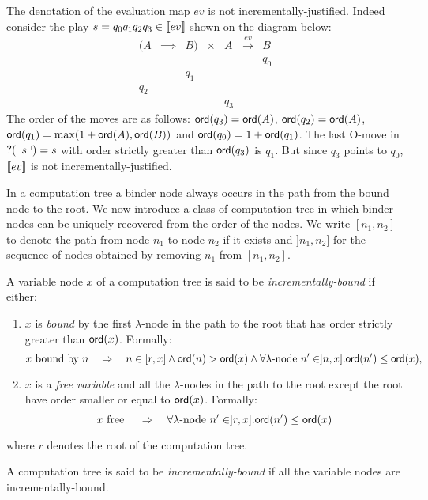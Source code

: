 \begin{exmp}
\label{examp:evnotincrjust}
The denotation of the evaluation map $ev$ is not
incrementally-justified. Indeed consider the play $s = q_0 q_1 q_2
q_3 \in {[\![ev ]\!]}$ shown on the diagram below:
$$\begin{array}{cccccccc}
(A & \implies & B) & \times  & A & \stackrel{ev}{\longrightarrow} & B \\
&&&&&& q_0 \\
&& q_1 \\
 q_2 \\
 &&&&q_3
\end{array}$$
The order of the moves are as follows:  ${\sf ord}(q_3) = {\sf ord}(A)$,
${\sf ord}(q_2) = {\sf ord}(A)$, ${\sf ord}(q_1) = \max( 1+{\sf ord}(A), {\sf ord}(B))$ and
${\sf ord}(q_0) = 1 + {\sf ord}(q_1)$. The last O-move in $?(\ulcorner s \urcorner)= s$
with order strictly greater than ${\sf ord}(q_3)$ is $q_1$.
 But since $q_3$ points to $q_0$, ${[\![ ev ]\!]}$ is not incrementally-justified.
\end{exmp}


In a computation tree a binder node always occurs in the path from
the bound node to the root. We now introduce a class of computation
tree in which binder nodes can be uniquely recovered from the order
of the nodes. We write $[n_1,n_2]$ to denote the path from node
$n_1$ to node $n_2$ if it exists and $]n_1,n_2]$ for the sequence of
nodes obtained by removing $n_1$ from $[n_1,n_2]$.

\begin{dfn}
A variable node $x$ of a computation tree is said to be
\emph{incrementally-bound} if either:
\begin{enumerate}
\item $x$ is \emph{bound} by the first $\lambda$-node in the path to the root that has
order strictly greater than ${\sf ord}(x)$. Formally:
$$ x \mbox{ bound by } n \quad \Rightarrow \quad n \in [r,x] \wedge {\sf ord}(n) > {\sf ord}(x) \wedge \forall \lambda\mbox{-node } n' \in ]n,x] . {\sf ord}(n') \leq {\sf ord}(x),$$

\item $x$ is a \emph{free variable} and all the $\lambda$-nodes in the path to the root except the root have order
smaller or equal to ${\sf ord}(x)$. Formally:
$$ x \mbox{ free } \quad \Rightarrow \quad  \forall \lambda\mbox{-node } n' \in ]r,x] . {\sf ord}(n') \leq {\sf ord}(x)$$
\end{enumerate}
where $r$ denotes the root of the computation tree.

A computation tree is said to be \emph{incrementally-bound} if all
the variable nodes are incrementally-bound.
\end{dfn}

